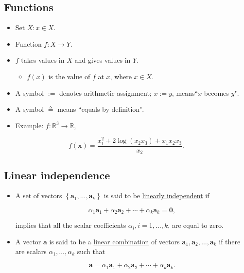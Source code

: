 \documentclass[12pt,thmsa]{article}
\begin{document}
\subsection{Functions}
\begin{itemize}
	\item Set \(X: x \in X\).
	\item Function \(f: X \rightarrow Y\).
	
	\item \(f\) takes values in \(X\) and gives values in \(Y\).
	
	\begin{itemize}
	\item \(f(x)\) is the value of \(f\) at \(x\), where \(x \in X\).
	\end{itemize}

	\item A symbol \(:=\) denotes arithmetic assignment; \(x:=y\), means``\(x\) becomes \(y\)".
	
	\item A symbol \(\triangleq\) means ``equals by definition".
	
	\item Example: \(f: \mathbb{R}^{3} \rightarrow \mathbb{R}\),
	
\end{itemize}

\begin{equation*}
	f(\boldsymbol{x})=\frac{x_{1}^{2}+2 \log \left(x_{2} x_{3}\right) + x_{1}x_{2}x_{3}}{x_{2}}.
\end{equation*}


\subsection{Linear independence}
\begin{itemize}	
	\item A set of vectors \(\left\{\boldsymbol{a}_{1}, \ldots, \boldsymbol{a}_{k}\right\}\) is said to be \underline{linearly independent} if

	\begin{equation*}
		\alpha_{1} \boldsymbol{a}_{1}+\alpha_{2} \boldsymbol{a}_{2}+\cdots+\alpha_{k} \boldsymbol{a}_{k}=\mathbf{0},
	\end{equation*}
	
	implies that {\color{blue}all} the scalar coefficients \(\alpha_{i}, i=1, \ldots, k\), are equal to zero.
	
		\item A vector \(\boldsymbol{a}\) is said to be a \underline{linear combination} of vectors \(\boldsymbol{a}_{1}, \boldsymbol{a}_{2}, \ldots, \boldsymbol{a}_{k}\) if there are scalars \(\alpha_{1}, \ldots, \alpha_{k}\) such that
	
	\begin{equation*}
		\boldsymbol{a}=\alpha_{1} \boldsymbol{a}_{1}+\alpha_{2} \boldsymbol{a}_{2}+\cdots+\alpha_{k} \boldsymbol{a}_{k} .
	\end{equation*}

\end{itemize}
\end{document}
